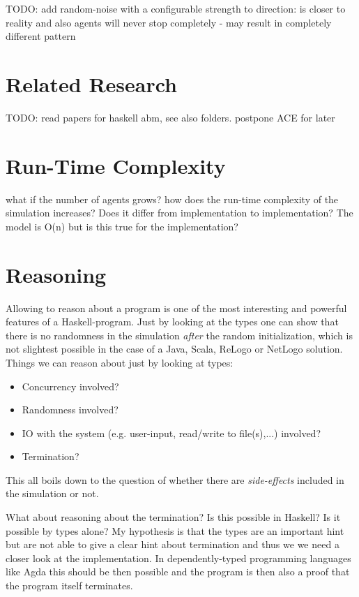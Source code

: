 TODO: add random-noise with a configurable strength to direction: is closer to reality and also agents will never stop completely - may result in completely different pattern

\section{Related Research}
TODO: read papers for haskell abm, see also folders. postpone ACE for later

\section{Run-Time Complexity}
what if the number of agents grows? how does the run-time complexity of the simulation increases? Does it differ from implementation to implementation? The model is O(n) but is this true for the implementation?

\section{Reasoning}
Allowing to reason about a program is one of the most interesting and powerful features of a Haskell-program. Just by looking at the types one can show that there is no randomness in the simulation \textit{after} the random initialization, which is not slightest possible in the case of a Java, Scala, ReLogo or NetLogo solution. Things we can reason about just by looking at types:

\begin{itemize}
\item Concurrency involved?
\item Randomness involved?
\item IO with the system (e.g. user-input, read/write to file(s),...) involved?
\item Termination?
\end{itemize}

This all boils down to the question of whether there are \textit{side-effects} included in the simulation or not.

What about reasoning about the termination? Is this possible in Haskell? Is it possible by types alone? My hypothesis is that the types are an important hint but are not able to give a clear hint about termination and thus we we need a closer look at the implementation. In dependently-typed programming languages like Agda this should be then possible and the program is then also a 
proof that the program itself terminates.

